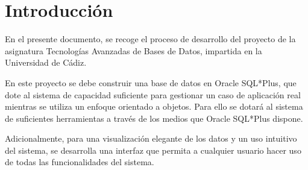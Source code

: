 \section{Introducción}
En el presente documento, se recoge el proceso de desarrollo del proyecto de la asignatura Tecnologías Avanzadas de Bases de Datos, impartida en la Universidad de Cádiz.

En este proyecto se debe construir una base de datos en Oracle SQL*Plus, que dote al sistema de capacidad suficiente para gestionar un caso de aplicación real mientras se utiliza un enfoque orientado a objetos. Para ello se dotará al sistema de suficientes herramientas a través de los medios que Oracle SQL*Plus dispone.

Adicionalmente, para una visualización elegante de los datos y un uso intuitivo del sistema, se desarrolla una interfaz que permita a cualquier usuario hacer uso de todas las funcionalidades del sistema.